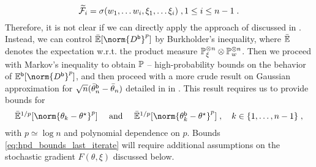 \begin{equation}
\label{eq: extended filtration}
  \widetilde{\mathcal{F}}_i = \sigma(w_1,\ldots w_i, \xi_1,\ldots \xi_i) \;, 1 \le i \le n-1 \;.
\end{equation} 
Therefore, it is not clear if we can directly apply the approach of \cite{shao2022berry} discussed in . Instead, we can control $\bar{\PE}[\norm{D^\boot}^p]$ by Burkholder's inequality, where $\bar{\mathbb{E}}$ denotes the expectation w.r.t. the product measure $\mathbb{P}_\xi^{\otimes n} \otimes \mathbb{P}_w^{\otimes n}$. Then we proceed with Markov's inequality to obtain $\mathbb{P}$ -- high-probability bounds on the behavior of $\PEb[\norm{D^\boot}^p]$, and then proceed with a more crude result on Gaussian approximation for $\sqrt n  (\bar{\theta}_{n}^{\mathsf{b}} - \bar{\theta}_n)$ detailed in  in . This result requires us to provide bounds for
\begin{equation}
\label{eq:hpd_bounds_last_iterate}
\textstyle 
\bar{\PE}^{1/p}[\norm{\theta_k - \thetas}^{p}] \quad \text{  and  } \quad \bar{\PE}^{1/p}[\norm{\theta_k^{\boot} - \thetas}^{p}]\eqsp, \quad k \in \{1,\ldots,n-1\}\eqsp,
\end{equation}
with $p \simeq \log{n}$ and polynomial dependence on $p$. Bounds \eqref{eq:hpd_bounds_last_iterate} will require additional assumptions on the stochastic gradient $F(\theta,\xi)$ discussed below.

